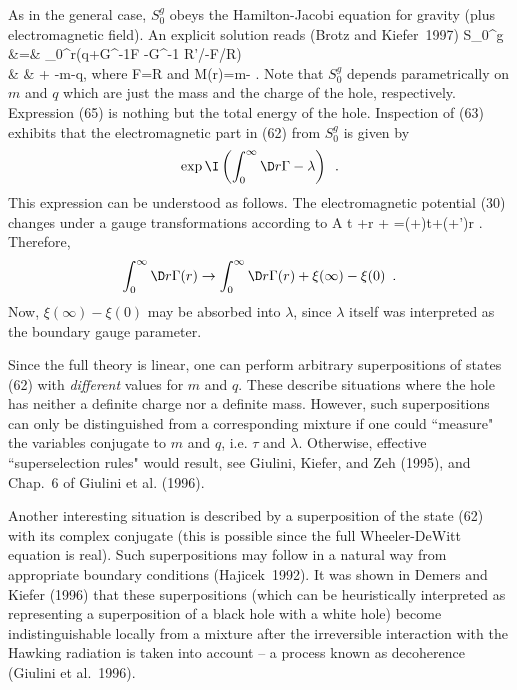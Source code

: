 As in the general case, $S_0^g$ obeys the Hamilton-Jacobi equation
for gravity (plus electromagnetic field). An explicit solution
reads (Brotz and Kiefer~1997)
\bea S_0^g &=& \int_0^{\infty}\D r\left(q\Gamma +G^{-1}\Lambda F
     -G^{-1}\ln{}
       {R'/\Lambda -F/R}\right) \nonumber\\
    & & \; + -m\tau -q\lambda \enspace , \eea
where
\be F=R \ee
and
\be M(r)=m- \enspace . \ee
Note that $S_0^g$ depends parametrically on $m$ and $q$
which are just the mass and the charge of the hole, respectively.
Expression (65) is nothing but the total energy of the hole.
Inspection of (63) exhibits that the electromagnetic part in
(62) from $S_0^g$ is given by
\[ \exp\I\left(\int_0^{\infty}\D r\Gamma -\lambda\right) \enspace . \]
This expression can be understood as follows. The electromagnetic
potential (30) changes under a gauge transformations according to
\be A \to \phi \D t +\Gamma\D r +\D \xi
     =(\phi+\dot{\xi})\D t+(\Gamma+\xi')\D r \enspace . \ee
Therefore,
\[ \int_0^{\infty}\D r\Gamma(r) \to \int_0^{\infty}
    \D r\Gamma(r)+\xi(\infty)-\xi(0) \enspace . \]
Now, $\xi(\infty)-\xi(0)$ may be absorbed into $\lambda$, since
$\lambda$ itself was interpreted as the boundary gauge parameter.

Since the full theory is linear, one can perform arbitrary
superpositions of states (62) with {\em different} values
for $m$ and $q$. These describe situations where the hole has neither
a definite charge nor a definite mass. However, such superpositions
can only be distinguished from a corresponding mixture if one
could ``measure" the variables conjugate to $m$ and $q$,
i.e. $\tau$ and $\lambda$. Otherwise, effective ``superselection
rules" would result, see Giulini, Kiefer, and Zeh (1995),
and Chap.~6 of Giulini et al. (1996).

Another interesting situation is described by a superposition
of the state (62) with its complex conjugate (this is possible
since the full Wheeler-DeWitt equation is real). Such
superpositions may follow in a natural way from appropriate
boundary conditions (Hajicek~1992). It was shown in
Demers and Kiefer (1996) that these superpositions (which can be
heuristically interpreted as representing a superposition
of a black hole with a white hole) become indistinguishable
locally from a mixture after the irreversible interaction
with the Hawking radiation is taken into account -- a process
known as decoherence (Giulini et al.~1996).

